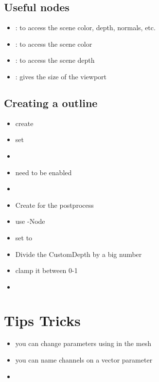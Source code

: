         \subsection{Useful nodes}
            \begin{itemize}
                \item {}: to access the scene color, depth, normals, etc.
                \item {}: to access the scene color
                \item {}: to access the scene depth
                \item {}: gives the size of the viewport
            \end{itemize}


        \subsection{Creating a outline}
            \begin{itemize}
                \item create 
                \item set 
                \item 
                \item {} need  to be enabled
                \item 
                \item Create  for the postprocess
                \item use -Node
                \item set  to 
                \item Divide the CustomDepth by a big number
                \item clamp it between 0-1
                \item 
            \end{itemize}


    \section{Tips Tricks}
        \begin{itemize}
            \item you can change parameters using  in the mesh
            \item you can name channels on a vector parameter
            \item 
        \end{itemize}

